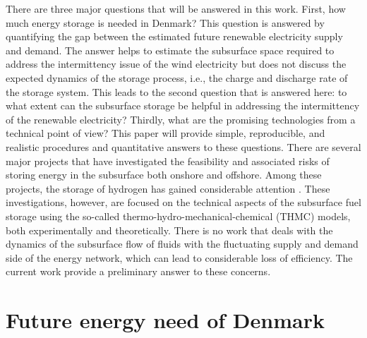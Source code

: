 \documentclass{ECOS_2021}
\begin{document}
There are three major questions that will be answered in this work.
First, how much energy storage is needed in Denmark? This question is answered by 
quantifying the gap between the estimated future renewable electricity supply and demand. 
The answer helps to estimate the subsurface space required to address the intermittency 
issue of the wind electricity but does not discuss the expected dynamics of the storage process, 
i.e., the charge and discharge rate of the storage system. This leads to the second question that 
is answered here: to what extent can the subsurface storage be helpful in addressing the
intermittency of the renewable electricity? Thirdly, what are the
promising technologies from a technical point of view? This paper
will provide simple, reproducible, and realistic procedures and quantitative
answers to these questions. There are several major projects that have investigated the feasibility and 
associated risks of storing energy in the subsurface \cite{bauerImpactsUseGeological2013,
bauerQuantifyingInducedEffects2015a} both onshore and offshore. Among these projects, the storage 
of hydrogen has gained considerable attention \cite{hassanpouryouzbandOffshoreGeologicalStorage2021}. 
These investigations, however, are focused on the technical aspects of the subsurface fuel storage using the 
so-called thermo-hydro-mechanical-chemical (THMC) models, both experimentally and theoretically. 
There is no work that deals with the dynamics of the subsurface flow of fluids 
with the fluctuating supply and demand side of the energy network, which can lead to 
considerable loss of efficiency. The current work provide a preliminary answer to 
these concerns.

\sffamily \section{Future energy need of Denmark}
\normalsize
\end{document}
